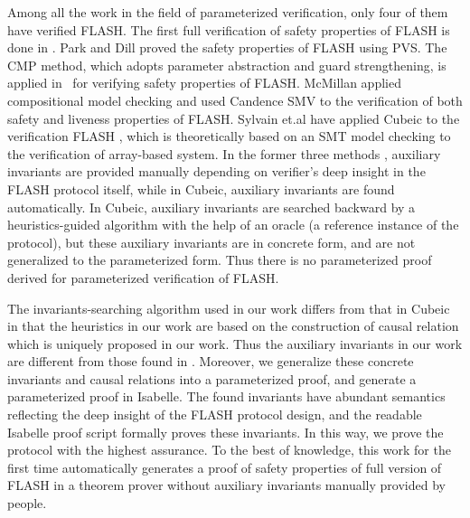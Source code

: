 \documentclass[final]{IEEEtran}
\begin{document}
Among all the work in the  field of parameterized verification, only four of them have verified FLASH. The first full verification of safety properties of FLASH is done in \cite{Park1996a}. Park and Dill  proved the safety properties of FLASH using  PVS. %
The CMP method, which adopts parameter abstraction and guard strengthening, is applied %
in~\cite{Chou2004} for verifying  safety properties  of
FLASH.  %
McMillan applied compositional
model checking \cite{McMillan2001}  and used Candence SMV  to the verification of both safety and liveness properties of FLASH. Sylvain et.al have applied Cubeic to the verification FLASH \cite{cubicle2011,Conchon2013}, which is theoretically based on an SMT  model checking to the verification of array-based system.
 In the  former three methods \cite{Park1996a,Chou2004,McMillan2001}, auxiliary invariants are provided manually depending on verifier's deep insight in the FLASH protocol itself, while in Cubeic, auxiliary invariants are found automatically.  In  Cubeic, auxiliary invariants are searched backward  by a heuristics-guided algorithm with the help of an oracle (a reference instance of the protocol), but these auxiliary invariants are in concrete form, and are not generalized to the parameterized form. Thus there is no  parameterized proof derived for parameterized verification of FLASH.


The invariants-searching  algorithm used in our work differs from that in Cubeic \cite{cubicle2011,Conchon2013} in that the heuristics in our work are based on the construction of causal relation which is uniquely proposed in our work. Thus the auxiliary invariants in our work are different from those found in \cite{cubicle2011,Conchon2013}. Moreover, we generalize these concrete invariants and causal relations into a parameterized proof, and  generate a parameterized proof in Isabelle. The found invariants have abundant semantics reflecting the deep insight   of the FLASH protocol design, and the readable Isabelle proof script formally proves these invariants. In this way, we prove the protocol with the highest assurance. To the best of knowledge, this work for the first time automatically generates a proof of safety properties of full version of FLASH in a theorem prover without auxiliary invariants manually provided by people.
\end{document}
